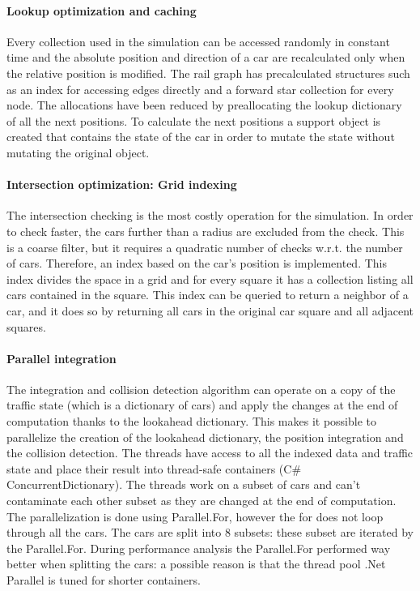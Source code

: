 \documentclass[12pt]{article}
\begin{document}
\paragraph{Lookup optimization and caching}
Every collection used in the simulation can be accessed randomly in constant time and the absolute position and direction of a car are recalculated only when the relative position is modified. The rail graph has precalculated structures such as an index for accessing edges directly and a forward star collection for every node. The allocations have been reduced by preallocating the lookup dictionary of all the next positions. To calculate the next positions a support object is created that contains the state of the car in order to mutate the state without mutating the original object.

\paragraph{Intersection optimization: Grid indexing}
The intersection checking is the most costly operation for the simulation. In order to check faster, the cars further than a radius are excluded from the check. This is a coarse filter, but it requires a quadratic number of checks w.r.t. the number of cars. Therefore, an index based on the car's position is implemented. This index divides the space in a grid and for every square it has a collection listing all cars contained in the square. This index can be queried to return a neighbor of a car, and it does so by returning all cars in the original car square and all adjacent squares. 

\paragraph{Parallel integration}
The integration and collision detection algorithm can operate on a copy of the traffic state (which is a dictionary of cars) and apply the changes at the end of computation thanks to the lookahead dictionary. This makes it possible to parallelize the creation of the lookahead dictionary, the position integration and the collision detection. The threads have access to all the indexed data and traffic state and place their result into thread-safe containers (C\# ConcurrentDictionary). The threads work on a subset of cars and can't contaminate each other subset as they are changed at the end of computation. The parallelization is done using Parallel.For, however the for does not loop through all the cars. The cars are split into 8 subsets: these subset are iterated by the Parallel.For. During performance analysis the Parallel.For performed way better when splitting the cars: a possible reason is that the thread pool .Net Parallel is tuned for shorter containers.
\end{document}
